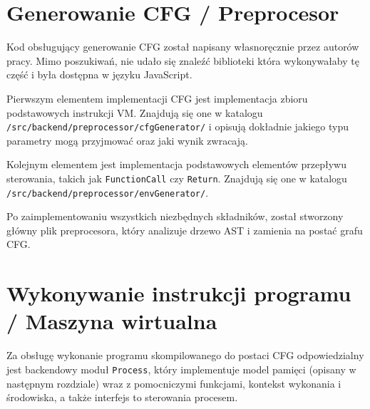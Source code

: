 \documentclass[a4paper,twoside,openright,11pt]{report}
\begin{document}
  \section {Generowanie CFG / Preprocesor}
	\par Kod obsługujący generowanie CFG został napisany własnoręcznie przez autorów pracy. Mimo poszukiwań, nie udało się znaleźć biblioteki która wykonywałaby tę część i była dostępna w języku JavaScript.
	\par Pierwszym elementem implementacji CFG jest implementacja zbioru podstawowych instrukcji VM. Znajdują się one w katalogu \texttt{/src/backend/preprocessor/cfgGenerator/} i opisują dokładnie jakiego typu parametry mogą przyjmować oraz jaki wynik zwracają. 
	\par Kolejnym elementem jest implementacja podstawowych elementów przepływu sterowania, takich jak \texttt{FunctionCall} czy \texttt{Return}. Znajdują się one w katalogu \\ \texttt{/src/backend/preprocessor/envGenerator/}.
	\par Po zaimplementowaniu wszystkich niezbędnych składników, został stworzony główny plik preprocesora, który analizuje drzewo AST i zamienia na postać grafu CFG.
	  
  \section {Wykonywanie instrukcji programu / Maszyna wirtualna}
 	\par Za obsługę wykonanie programu skompilowanego do postaci CFG odpowiedzialny jest backendowy moduł \texttt{Process}, który implementuje model pamięci (opisany w następnym rozdziale) wraz z pomocniczymi funkcjami, kontekst wykonania i środowiska, a także interfejs to sterowania procesem.
\end{document}

